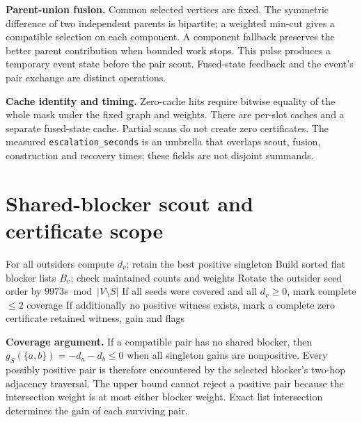 \documentclass[10pt,a4paper]{article}
\begin{document}
\textbf{Parent-union fusion.}
Common selected vertices are fixed. The symmetric difference of two
independent parents is bipartite; a weighted min-cut gives a compatible
selection on each component. A component fallback preserves the better
parent contribution when bounded work stops. This pulse produces a
temporary event state before the pair scout. Fused-state feedback and
the event's pair exchange are distinct operations.

\textbf{Cache identity and timing.}
Zero-cache hits require bitwise equality of the whole mask under the fixed
graph and weights. There are per-slot caches and a separate fused-state
cache. Partial scans do not create zero certificates. The measured
\texttt{escalation\_seconds} is an umbrella that overlaps scout, fusion,
construction and recovery times; these fields are not disjoint summands.

\clearpage
\section*{Shared-blocker scout and certificate scope}
\begin{algorithm}[H]
For all outsiders compute $d_v$; retain the best positive singleton\;
Build sorted flat blocker lists $B_v$; check maintained counts and weights\;
Rotate the outsider seed order by $9973e\bmod|V\setminus S|$\;
If all seeds were covered and all $d_v\geq0$, mark complete $\leq2$ coverage\;
If additionally no positive witness exists, mark a complete zero certificate\;
\Return retained witness, gain and flags\;
\caption{Analytical shared-blocker screening}
\end{algorithm}

\textbf{Coverage argument.}
If a compatible pair has no shared blocker, then
$g_S(\{a,b\})=-d_a-d_b\leq0$ when all singleton gains are nonpositive.
Every possibly positive pair is therefore encountered by the selected
blocker's two-hop adjacency traversal. The upper bound cannot reject a
positive pair because the intersection weight is at most either blocker
weight. Exact list intersection determines the gain of each surviving pair.
\end{document}
